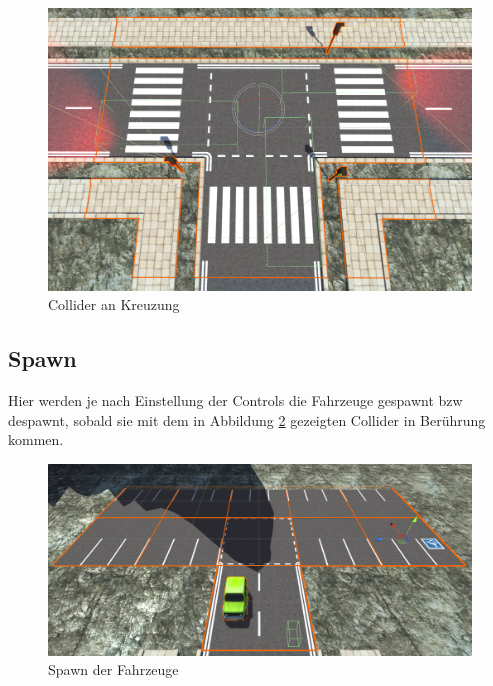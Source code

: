 \begin{figure}[H]
\begin{center}
	\includegraphics[width=1\textwidth]{BilderAllgemein/crossing_collider.png}
\end{center}
	\caption{Collider an Kreuzung}
	\label{img:crossing_collider}
\end{figure}

\subsection{Spawn}

Hier werden je nach Einstellung der Controls die Fahrzeuge gespawnt bzw despawnt, sobald sie mit dem in Abbildung \ref{img:spawn} gezeigten Collider in Berührung kommen.

\begin{figure}[H]
\begin{center}
	\includegraphics[width=1\textwidth]{BilderAllgemein/spawn.png}
\end{center}
	\caption{Spawn der Fahrzeuge}
	\label{img:spawn}
\end{figure}

